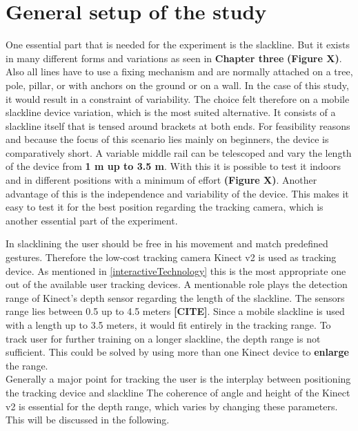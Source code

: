 \section{General setup of the study} %
One essential part that is needed for the experiment is the slackline. But it exists in many different forms and variations as seen in \textbf{Chapter three} \textbf{ (Figure X)}. Also all lines have to use a fixing mechanism and are normally attached on a tree, pole, pillar, or with anchors on the ground or on a wall. In the case of this study, it would result in a constraint of variability. 
The choice felt therefore on a mobile slackline device variation, which is the most suited alternative. It consists of a slackline itself that is tensed around brackets at both ends. For feasibility reasons and because the focus of this scenario lies mainly on beginners, the device is comparatively short. A variable middle rail can be telescoped and vary the length of the device from \textbf{1 m up to 3.5 m}. With this it is possible to test it indoors and in different positions with a minimum of effort \textbf{(Figure X)}. Another advantage of this is the independence and variability of the device. This makes it easy to test it for the best position regarding the tracking camera, which is another essential part of the experiment.

In slacklining the user should be free in his movement and match predefined gestures. Therefore the low-cost tracking camera Kinect v2 is used as tracking device. As mentioned in \ref{interactiveTechnology} this is the most appropriate one out of the available user tracking devices.
A mentionable role plays the detection range of Kinect’s depth sensor regarding the length of the slackline. The sensors range lies between 0.5 up to 4.5 meters \textbf{[CITE]}. Since a mobile slackline is used with a length up to 3.5 meters, it would fit entirely in the tracking range. To track user for further training on a longer slackline, the depth range is not sufficient. This could be solved by using more than one Kinect device to \textbf{enlarge} the range. 
\\
Generally a major point for tracking the user is the interplay between positioning the tracking device and slackline The coherence of angle and height of the Kinect v2 is essential for the depth range, which varies by changing these parameters. This will be discussed in the following.
